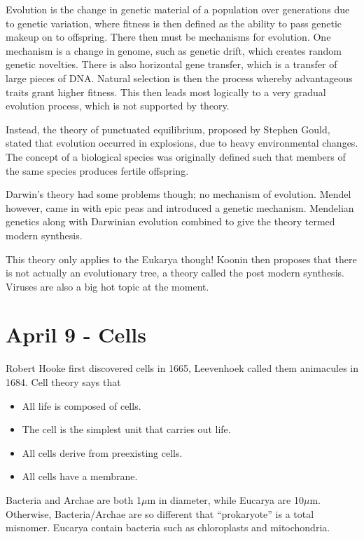 \documentclass[12pt]{article}
\begin{document}
Evolution is the change in genetic material of a population over generations due to genetic variation, where fitness is then defined as the ability to pass genetic makeup on to offspring. There then must be mechanisms for evolution. One mechanism is a change in genome, such as genetic drift, which creates random genetic novelties. There is also horizontal gene transfer, which is a transfer of large pieces of DNA. Natural selection is then the process whereby advantageous traits grant higher fitness. This then leads most logically to a very gradual evolution process, which is not supported by theory.

Instead, the theory of punctuated equilibrium, proposed by Stephen Gould, stated that evolution occurred in explosions, due to heavy environmental changes. The concept of a biological species was originally defined such that members of the same species produces fertile offspring.

Darwin's theory had some problems though; no mechanism of evolution. Mendel however, came in with epic peas and introduced a genetic mechanism. Mendelian genetics along with Darwinian evolution combined to give the theory termed modern synthesis.

This theory only applies to the Eukarya though! Koonin then proposes that there is not actually an evolutionary tree, a theory called the post modern synthesis. Viruses are also a big hot topic at the moment. 

\section*{April 9 - Cells}

Robert Hooke first discovered cells in 1665, Leevenhoek called them animacules in 1684. Cell theory says that

\begin{itemize}
	\item All life is composed of cells.
	\item The cell is the simplest unit that carries out life.
	\item All cells derive from preexisting cells.
	\item All cells have a membrane.
\end{itemize}

Bacteria and Archae are both 1$\mu$m in diameter, while Eucarya are 10$\mu$m. Otherwise, Bacteria/Archae are so different that ``prokaryote'' is a total misnomer. Eucarya contain bacteria such as chloroplasts and mitochondria.
\end{document}
